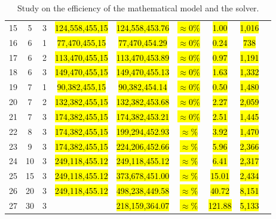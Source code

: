 \documentclass{singlecol}
\theoremstyle{TH}{
\newtheorem{lemma}{Lemma}
\newtheorem{theorem}[lemma]{Theorem}
\newtheorem{corrolary}[lemma]{Corrolary}
\newtheorem{conjecture}[lemma]{Conjecture}
\newtheorem{proposition}[lemma]{Proposition}
\newtheorem{claim}[lemma]{Claim}
\newtheorem{stheorem}[lemma]{Wrong Theorem}
\newtheorem{algorithm}{Algorithm}
}
\theoremstyle{THrm}{
\newtheorem{definition}{Definition}[section]
\newtheorem{question}{Question}[section]
\newtheorem{remark}{Remark}
\newtheorem{scheme}{Scheme}
}
\theoremstyle{THhit}{
\newtheorem{case}{Case}[section]
}
\begin{document}
\begin{table}[h!]
\begin{center}
\begin{small}
\begin{tabular}{ c c c c c c c c c }
	 15  &  5 & 3  & \hl{124,558,455,15} & \hl{124,558,453.76} & \hl{$\approx 0\%$} &  \hl{1.00}   &   \hl{1,016}       \\
	 16  &  6 & 1  & \hl{77,470,455,15} & \hl{77,470,454.29}  & \hl{$\approx 0\%$}  &  \hl{0.24}   &   \hl{738}       \\
	 17  &  6 & 2  & \hl{113,470,455,15} & \hl{113,470,453.89}  & \hl{$\approx 0\%$} &  \hl{0.97}   &   \hl{1,191}      \\
	 18  &  6 & 3  & \hl{149,470,455,15} & \hl{149,470,455.13}  & \hl{$\approx 0\%$} & \hl{1.63}   &   \hl{1,332}     \\
	 19  &  7 & 1  & \hl{90,382,455,15}  & \hl{90,382,454.14}  & \hl{$\approx 0\%$} &  \hl{0.50}   &  \hl{1,480}       \\
	 20  &  7 & 2  & \hl{132,382,455,15} & \hl{132,382,453.68}  & \hl{$\approx 0\%$}  &  \hl{2.27}   &  \hl{2,059}      \\
	 21  &  7 & 3  & \hl{174,382,455,15} & \hl{174,382,453.21}  & \hl{$\approx 0\%$}  &  \hl{2.51}   &  \hl{1,445}      \\
         22  &  8 & 3  & \hl{174,382,455,15} & \hl{199,294,452.93}  & \hl{$\approx \%$}  &  \hl{3.92}   &  \hl{1,470}      \\
	 23  &  9 & 3  & \hl{174,382,455,15} & \hl{224,206,452.66}  & \hl{$\approx \%$}  &  \hl{5.96}   &  \hl{2,366}      \\
	 24  & 10 & 3  & \hl{249,118,455.12} & \hl{249,118,455.12}  & \hl{$\approx \%$}  &  \hl{6.41}   &  \hl{2,317}      \\
	 25  & 15 & 3  & \hl{249,118,455.12} & \hl{373,678,451.00}  & \hl{$\approx \%$}  &  \hl{15.01}   &  \hl{2,434}      \\
         26  & 20 & 3  & \hl{249,118,455.12} & \hl{498,238,449.58}  & \hl{$\approx \%$}  &  \hl{40.72}   &  \hl{8,151}      \\
	 27  & 30 & 3  & \hl{} & \hl{218,159,364.07}  & \hl{$\approx \%$}  &  \hl{121.88}   &  \hl{5,133}      \\
	
	\end{tabular}
\caption{Study on the efficiency of the mathematical model and the solver.}
\label{tab:lingoEvaluation}
\end{small}
\end{center}
\end{table}
\end{document}

